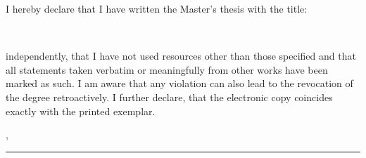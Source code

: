I hereby declare that I have written the Master's thesis with the title:

\begin{center}
\textit{\glqq\titel\grqq}\\[1em]
\end{center}
			
independently, that I have not used resources other than those specified and that all statements taken verbatim or meaningfully from other works have been marked as such. I am aware that any violation can also lead to the revocation of the degree retroactively. I further declare, that the electronic copy coincides exactly with the printed exemplar.
\par
\ort, \eingereicht


\rule[-0.2cm]{5cm}{0.5pt}

\textsc{\autor} 
